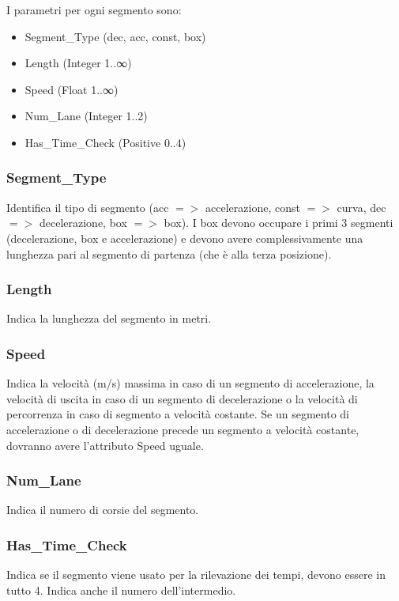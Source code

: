 \documentclass[a4paper,11pt, twoside, openright]{book}
\begin{document}
	I parametri per ogni segmento sono:
	\begin{itemize}
	  \item Segment\_Type (dec, acc, const, box)
	  \item Length (Integer 1..∞)
	  \item Speed (Float 1..∞) 
	  \item Num\_Lane (Integer 1..2)
	  \item Has\_Time\_Check (Positive 0..4)
	\end{itemize}
	
	\subsubsection{Segment\_Type}
	  Identifica il tipo di segmento (acc $=>$ accelerazione, const $=>$ curva, dec $=>$ decelerazione, box $=>$ box). 
	  I box devono occupare i primi 3 segmenti (decelerazione, box e accelerazione) e devono avere complessivamente una lunghezza
	  pari al segmento di partenza (che è alla terza posizione).

	\subsubsection{Length}
	  Indica la lunghezza del segmento in metri.

	\subsubsection{Speed}
	  Indica la velocità (m/s) massima in caso di un segmento di accelerazione, la velocità di uscita in caso di 
	  un segmento di decelerazione o la velocità di percorrenza in caso di segmento a velocità costante.
	  Se un segmento di accelerazione o di decelerazione precede un segmento a velocità costante, dovranno avere l'attributo 
	  Speed uguale.

	\subsubsection{Num\_Lane}
	  Indica il numero di corsie del segmento.

	\subsubsection{Has\_Time\_Check}
	  Indica se il segmento viene usato per la rilevazione dei tempi, devono essere in tutto 4. 
	  Indica anche il numero dell'intermedio.
      
\end{document}
